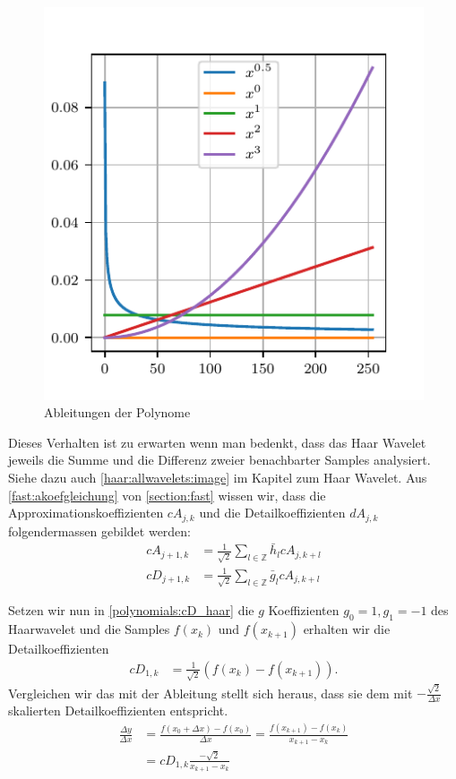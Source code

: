 \begin{refsection}
\begin{figure}
    \centering
    \includegraphics{papers/polynomials/images/polynomials_signals_diff.pdf}
    \caption{Ableitungen der Polynome\label{polynomials:diff}}
\end{figure}

Dieses Verhalten ist zu erwarten wenn man bedenkt, dass das Haar Wavelet
jeweils die Summe und die Differenz zweier benachbarter Samples analysiert.
Siehe dazu auch \cref{haar:allwavelets:image} im Kapitel zum Haar Wavelet. Aus
\cref{fast:akoefgleichung} von \cref{section:fast} wissen wir, dass die
Approximationskoeffizienten $cA_{j,k}$ und die Detailkoeffizienten $dA_{j,k}$
folgendermassen gebildet werden:
\begin{align}
cA_{j+1,k}
&=
\frac{1}{\sqrt{2}} \sum_{l\in\mathbb Z} \bar{h}_l cA_{j,k+l} \nonumber
\\
cD_{j+1,k}
&=
\frac{1}{\sqrt{2}} \sum_{l\in\mathbb Z} \bar{g}_l cA_{j,k+l}
\label{polynomials:cD_haar}
\end{align}

Setzen wir nun in \cref{polynomials:cD_haar} die $g$ Koeffizienten $g_0 = 1,
g_1 = -1$ des Haarwavelet und die Samples $f(x_k)$ und $f(x_{k + 1})$ erhalten
wir die Detailkoeffizienten
\begin{align}
    cD_{1,k} & = \frac{1}{\sqrt{2}}\left(f(x_k) - f(x_{k + 1})\right).
\end{align}
Vergleichen wir das mit der Ableitung stellt sich heraus, dass sie dem mit
$-\frac{\sqrt{2}}{\Delta x}$ skalierten Detailkoeffizienten entspricht.
\begin{align}
\frac{\Delta y}{\Delta x} &= \frac{f(x_0+\Delta x) - f(x_0)}{\Delta x}
                           = \frac{f(x_{k+1}) - f(x_k)}{x_{k+1} - x_k} \nonumber \\
                          &= cD_{1,k} \frac{-\sqrt{2}}{x_{k+1} - x_k}
                          \label{polynomials:eq:cD_haar_ableitung}
\end{align}


\end{refsection}
